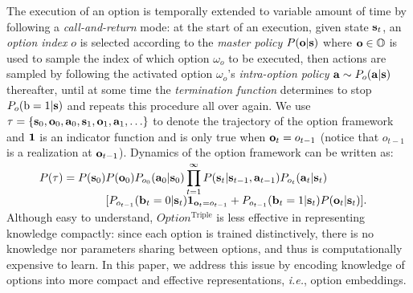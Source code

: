 \documentclass{article}
\begin{document}
The execution of an option is temporally extended to variable
amount of time by following a \emph{call-and-return} mode: at
the start of an execution, given state ${\mathbf{s}}_t$, an \emph{option
  index} $o$ is selected according to the \emph{master policy} $P({\mathbf{o}}|{\mathbf{s}})$ where ${\mathbf{o}}\in{\mathbb{O}}$ is used to
sample the index of which option $\omega_o$ to be executed,
then actions are sampled by following the activated option
$\omega_o$'s \emph{intra-option policy} ${\mathbf{a}}\sim P_o({\mathbf{a}}|{\mathbf{s}})$
thereafter, until at some time the \emph{termination function}
determines to stop $P_{o}({\textnormal{b}}=1|{\mathbf{s}})$ and repeats this procedure
all over again. We use $\tau=\{{\mathbf{s}}_0,{\mathbf{o}}_0,{\mathbf{a}}_0,{\mathbf{s}}_1,{\mathbf{o}}_1,{\mathbf{a}}_1,\ldots\}$
to denote the trajectory of the option framework and $\bm{1}$ is an
indicator function and is only true when ${\mathbf{o}}_t=o_{t-1}$ (notice
that $o_{t-1}$ is a realization at ${\mathbf{o}}_{t-1}$). Dynamics of the option framework can be written as:
\begin{align}
\vspace{-3mm}
  \label{eq:oc_pgm_joint}\nonumber\\[-2em]\nonumber
  P(\tau) = P(\rvs_0)&P(\rvo_0)P_{o_0}(\rva_0|\rvs_0)\prod_{t=1}^\infty P(\rvs_t|\rvs_{t-1},\rva_{t-1})P_{o_t}(\rva_{t}|\rvs_{t})\nonumber\\[-.5em]
                     &[P_{o_{t-1}}(\rvb_t=0|\rvs_t)\1_{\rvo_t=o_{t-1}} +P_{o_{t-1}}(\rvb_t=1|\rvs_t)P(\rvo_t|\rvs_t)].\\[-2em]\nonumber
\end{align}
Although easy to understand, $Option^{\textrm{Triple}}$ is less effective in
representing knowledge compactly:  since each
option is trained distinctively, there is no knowledge nor
parameters sharing between options, and thus is
computationally expensive to learn. In this paper, we
address this issue by encoding knowledge
of options into more compact and effective representations, \textit{i.e.},
option embeddings.
\end{document}
